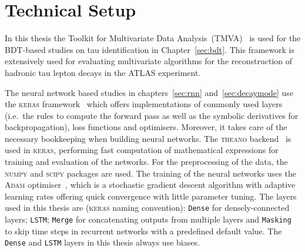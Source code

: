 \section{Technical Setup}
\label{sec:tech_setup}

In this thesis the Toolkit for Multivariate Data Analysis~(TMVA)~\cite{tmva} is
used for the BDT-based studies on tau identification in Chapter~\ref{sec:bdt}.
This framework is extensively used for evaluating multivariate algorithms for
the reconstruction of hadronic tau lepton decays in the ATLAS experiment.

The neural network based studies in chapters~\ref{sec:rnn}
and~\ref{sec:decaymode} use the \textsc{keras} framework~\cite{keras} which
offers implementations of commonly used layers (i.e.\ the rules to compute the
forward pass as well as the symbolic derivatives for backpropagation), loss
functions and optimisers. Moreover, it takes care of the necessary bookkeeping
when building neural networks. The \textsc{theano} backend~\cite{theano} is used
in \textsc{keras}, performing fast computation of mathematical expressions for
training and evaluation of the networks. For the preprocessing of the data, the
\textsc{numpy} \cite{numpy} and \textsc{scipy} \cite{scipy} packages are used.
The training of the neural networks uses the \textsc{Adam}
optimiser~\cite{adam}, which is a stochastic gradient descent algorithm with
adaptive learning rates offering quick convergence with little parameter tuning.
The layers used in this thesis are (\textsc{keras} naming convention):
\texttt{Dense} for densely-connected layers; \texttt{LSTM}; \texttt{Merge} for
concatenating outputs from multiple layers and \texttt{Masking} to skip time
steps in recurrent networks with a predefined default value. The \texttt{Dense}
and \texttt{LSTM} layers in this thesis always use biases.

